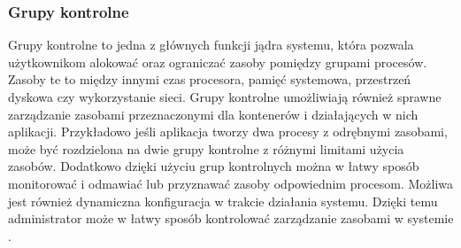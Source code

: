 \documentclass[12pt]{report}
\let\Oldsubsubsection\subsubsection
\renewcommand{\subsubsection}{\FloatBarrier\Oldsubsubsection}
\begin{document}
\subsubsection{Grupy kontrolne}
Grupy kontrolne to jedna z głównych funkcji jądra systemu, która pozwala użytkownikom alokować oraz ograniczać zasoby pomiędzy grupami procesów. Zasoby te to między innymi czas procesora, pamięć systemowa, przestrzeń dyskowa czy wykorzystanie sieci. Grupy kontrolne umożliwiają również sprawne zarządzanie zasobami przeznaczonymi dla kontenerów i działających w nich aplikacji. Przykładowo jeśli aplikacja tworzy dwa procesy z odrębnymi zasobami, może być rozdzielona na dwie grupy kontrolne z różnymi limitami użycia zasobów. Dodatkowo dzięki użyciu grup kontrolnych można w łatwy sposób monitorować i odmawiać lub przyznawać zasoby odpowiednim procesom. Możliwa jest również dynamiczna konfiguracja w trakcie działania systemu. Dzięki temu administrator może w łatwy sposób kontrolować zarządzanie zasobami w systemie \cite{linux}. 
\end{document}
